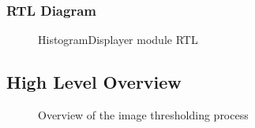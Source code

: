 \documentclass[12pt]{article}
\begin{document}
  \subsubsection{RTL Diagram}
    \begin{figure}[H]
    \caption{HistogramDisplayer module RTL}
    \label{fig:histogram_displayer_rtl}
  \end{figure}
  
  
  \subsection{High Level Overview}
  \begin{figure}[H]
    \caption{Overview of the image thresholding process}
    \label{fig:histogram_overview}
  \end{figure}
  
\end{document}
